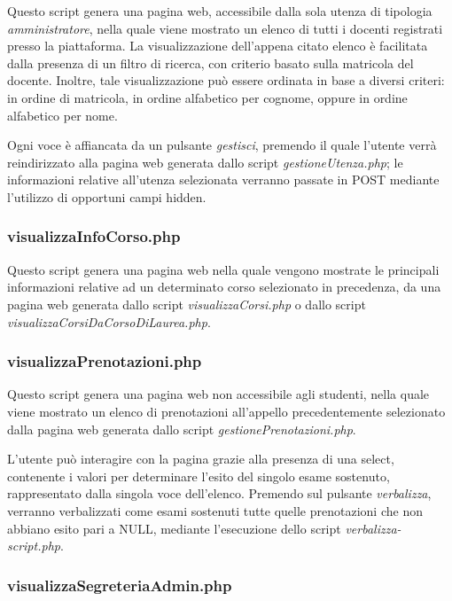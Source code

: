 \documentclass [a4paper,11pt]{book}
\begin{document}
Questo script genera una pagina web, accessibile dalla sola utenza di tipologia \emph{amministratore}, nella quale viene mostrato un elenco di tutti i docenti registrati presso la piattaforma. La visualizzazione dell'appena citato elenco è facilitata dalla presenza di un filtro di ricerca, con criterio basato sulla matricola del docente. Inoltre, tale visualizzazione può essere ordinata in base a diversi criteri: in ordine di matricola, in ordine alfabetico per cognome, oppure in ordine alfabetico per nome.

Ogni voce è affiancata da un pulsante \emph{gestisci}, premendo il quale l'utente verrà reindirizzato alla pagina web generata dallo script \emph{gestioneUtenza.php}; le informazioni relative all'utenza selezionata verranno passate in POST mediante l'utilizzo di opportuni campi hidden.

\medskip

\subsubsection{visualizzaInfoCorso.php}

Questo script genera una pagina web nella quale vengono mostrate le principali informazioni relative ad un determinato corso selezionato in precedenza, da una pagina web generata dallo script \emph{visualizzaCorsi.php} o dallo script \emph{visualizzaCorsiDaCorsoDiLaurea.php}.

\medskip

\subsubsection{visualizzaPrenotazioni.php}

Questo script genera una pagina web non accessibile agli studenti, nella quale viene mostrato un elenco di prenotazioni all'appello precedentemente selezionato dalla pagina web generata dallo script \emph{gestionePrenotazioni.php}.

L'utente può interagire con la pagina grazie alla presenza di una select, contenente i valori per determinare l'esito del singolo esame sostenuto, rappresentato dalla singola voce dell'elenco. Premendo sul pulsante \emph{verbalizza}, verranno verbalizzati come esami sostenuti tutte quelle prenotazioni che non abbiano esito pari a NULL, mediante l'esecuzione dello script \emph{verbalizza-script.php}.

\medskip

\subsubsection{visualizzaSegreteriaAdmin.php}
\end{document}
